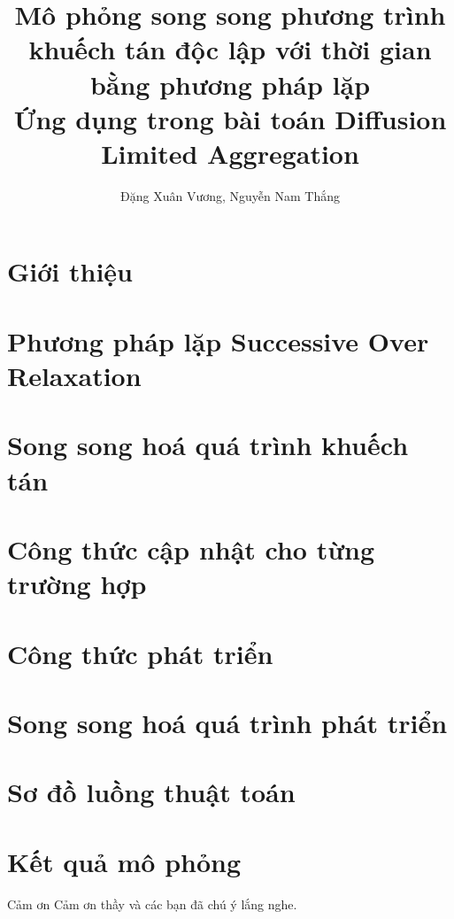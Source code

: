 \documentclass[11pt]{beamer}
\title[Hà Nội, Việt Nam]{Mô phỏng song song phương trình khuếch tán độc lập với thời gian bằng phương pháp lặp\\
Ứng dụng trong bài toán Diffusion Limited Aggregation}
\author[Xuân Vương, Nam Thắng]{
Đặng Xuân Vương, Nguyễn Nam Thắng}
\begin{document}


\section{Giới thiệu} 


\section{Phương pháp lặp Successive Over Relaxation}


\section{Song song hoá quá trình khuếch tán}


\section{Công thức cập nhật cho từng trường hợp}


\section{Công thức phát triển}


\section{Song song hoá quá trình phát triển}


\section{Sơ đồ luồng thuật toán}


\section{Kết quả mô phỏng}


\begin{frame}{Cảm ơn}
    \large{Cảm ơn thầy và các bạn đã chú ý lắng nghe.}
\end{frame}

\begin{frame}
\titlepage 
\end{frame}
\end{document}
